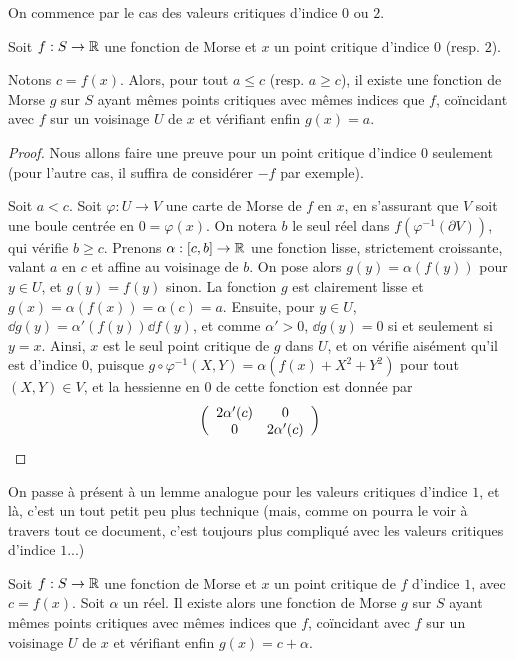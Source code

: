 On commence par le cas des valeurs critiques d'indice $0$ ou $2$. 

\begin{lem}
    Soit $f:S\to\operatorname{\mathbb R}$ une fonction de Morse et $x$ un point critique d'indice $0$ (resp. $2$).

    Notons $c=f(x)$. Alors, pour tout $a\leq c$ (resp. $a\geq c$), il existe une fonction de 
    Morse $g$ sur $S$ ayant mêmes points critiques avec mêmes indices que $f$,
    coïncidant avec $f$ sur un voisinage $U$ de $x$ et vérifiant enfin $g(x)=a$. 
\end{lem}

\begin{proof}
    Nous allons faire une preuve pour un point critique d'indice $0$ seulement (pour l'autre cas, 
    il suffira de considérer $-f$ par exemple). 

    Soit $a< c$. Soit $\varphi:U\to V$ une carte de Morse de $f$ en $x$, en s'assurant que 
    $V$ soit une boule centrée en $0=\varphi(x)$. 
    On notera $b$ le seul réel dans $f(\varphi^{-1}(\partial V))$, qui vérifie $b\geq c$.
    Prenons $\alpha:[c,b]\to\operatorname{\mathbb R}$ une fonction lisse, strictement croissante, valant $a$ en $c$ et affine au voisinage de $b$. 
    On pose alors $g(y)=\alpha(f(y))$ pour $y\in U$, et $g(y)=f(y)$ sinon.
    La fonction $g$ est clairement lisse et $g(x)=\alpha(f(x))=\alpha(c)=a$.
    Ensuite, pour $y\in U$, $\dd g(y)=\alpha'(f(y))\dd f(y)$, et comme $\alpha'>0$, $\dd g(y)=0$ 
    si et seulement si $y=x$. 
    Ainsi, $x$ est le seul point critique de $g$ dans $U$, et on vérifie aisément qu'il est 
    d'indice $0$, puisque $g\circ\varphi^{-1}(X,Y)=\alpha(f(x)+X^2+Y^2)$ pour tout $(X,Y)\in V$, 
    et  la hessienne en $0$ de cette fonction est donnée par 
    \[
        \left(\begin{array}{c c} 2\alpha'(c) & 0\\ 0 & 2\alpha'(c)\end{array}\right)
    \]
\end{proof}

On passe à présent à un lemme analogue pour les valeurs critiques d'indice $1$, et là, c'est un 
tout petit peu plus technique (mais, comme on pourra le voir à travers tout ce document, c'est 
toujours plus compliqué avec les valeurs critiques d'indice $1$...)

\begin{lem}
    Soit $f:S\to\operatorname{\mathbb R}$ une fonction de Morse et $x$ un point critique de $f$ d'indice $1$, avec 
    $c=f(x)$.
    Soit $\alpha$ un réel. 
    Il existe alors une fonction de Morse $g$ sur $S$ ayant mêmes points critiques avec mêmes 
    indices que $f$, coïncidant avec $f$ sur un voisinage $U$ de $x$ et vérifiant enfin 
    $g(x)=c+\alpha$. 
\end{lem}

